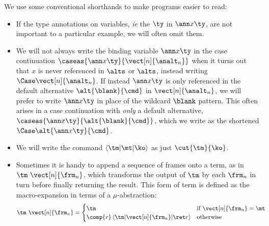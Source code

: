 \documentclass{article}
\begin{document}
We use some conventional shorthands to make programs easier to read:
\begin{itemize}
\item If the type annotations on variables, \emph{ie} the $\ty$ in $\ann x \ty$,
  are not important to a particular example, we will often omit them.


\item We will not always write the binding variable $\ann x \ty$ in the case
  continuation $\caseas{\ann x \ty}{\vect[n]{\analt_n}}$ when it turns out that
  $x$ is never referenced in $\alts$ or $\alts$, instead writing
  $\Case\vect[n]{\analt_n}$.  If instead $\ann x \ty$ is only referenced in the
  default alternative $\alt{\blank}{\cmd}$ in $\vect[n]{\analt_n}$, we will
  prefer to write $\ann x \ty$ in place of the wildcard $\blank$ pattern.  This
  often arises in a case continuation with \emph{only} a default alternative,
  $\caseas{\ann x \ty}{\alt{\blank}{\cmd}}$, which we write as the shortened
  $\Case\alt{\ann x \ty}{\cmd}$.

\item We will write the command $\braket{\tm | \mt | \ko}$ as just
  $\cut{\tm}{\ko}$.

\item
  Sometimes it is handy to append a sequence of frames onto a term, as in
  $\tm ~ \vect[n]{\frm_n}$, which transforms the output of $\tm$ by each
  $\frm_n$ in turn before finally returning the result.  This form of term is
  defined as the macro-expansion in terms of a $\mu$-abstraction:
  \begin{align*}
    \tm ~ \vect[n]{\frm_n}
    &=
    \begin{cases}
      \tm & \text{if } \vect[n]{\frm_n} = \mt
      \\
      \comp{r}\braket{\tm | \vect[n]{\frm_n} | \ret r} & \text{otherwise}
    \end{cases}
  \end{align*}
\end{itemize}
\end{document}
